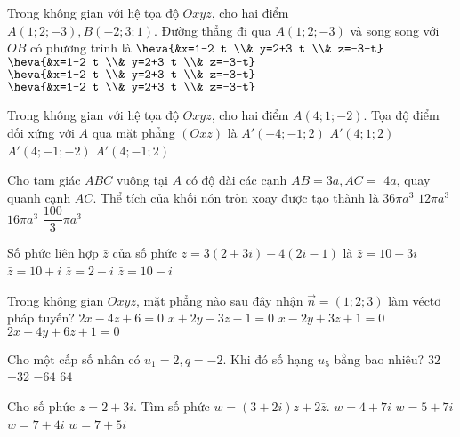 \begin{ex}%
Trong không gian với hệ tọa độ $O x y z$, cho hai điểm\\ $A(1; 2;-3), B(-2; 3; 1)$. Đường thẳng đi qua $A(1; 2;-3)$ và song song với $OB$ có phương trình là
\choice
{$\heva{&x=1-2 t \\& y=2+3 t \\& z=-3-t}$}
{$\heva{&x=1-2 t \\& y=2+3 t \\& z=-3-t}$}
{\True $\heva{&x=1-2 t \\& y=2+3 t \\& z=-3-t}$}
{$\heva{&x=1-2 t \\& y=2+3 t \\& z=-3-t}$}

\end{ex}
\begin{ex}%
Trong không gian với hệ tọa độ $O x y z$, cho hai điểm $A(4; 1;-2)$.
Tọa độ điểm đối xứng với $A$ qua mặt phẳng $(O x z)$ là
\choice
{$A'(-4;-1; 2)$}
{$A'(4; 1; 2)$}
{\True $A'(4;-1;-2)$}
{$A'(4;-1; 2)$}

\end{ex}
\begin{ex}%
Cho tam giác $ABC$ vuông tại $A$ có độ dài các cạnh $AB=3 a, AC=$ $4 a$, quay quanh cạnh $AC$. Thể tích của khối nón tròn xoay được tạo thành là
\choice
{$36\pi a^3$}
{$12\pi a^3$}
{\True $16\pi a^3$}
{$\dfrac{100}{3} \pi a^3$}

\end{ex}
\begin{ex}%
Số phức liên hợp $\bar{z}$ của số phức $z=3(2+3 i)-4(2 i-1)$ là
\choice
{$\bar{z}=10+3 i$}
{$\bar{z}=10+i$}
{$\bar{z}=2-i$}
{\True $\bar{z}=10-i$}

\end{ex}
\begin{ex}%
Trong không gian $O x y z$, mặt phẳng nào sau đây nhận $\vec{n}=(1; 2; 3)$ làm véctơ pháp tuyến?
\choice
{$2 x-4 z+6=0$}
{$x+2 y-3 z-1=0$}
{$x-2 y+3 z+1=0$}
{\True $2 x+4 y+6 z+1=0$}

\end{ex}
\begin{ex}%
Cho một cấp số nhân có $u_1=2, q=-2$. Khi đó số hạng $u_5$ bằng bao nhiêu?
\choice
{\True $32$}
{$-32$}
{$-64$}
{$64$}

\end{ex}
\begin{ex}%
Cho số phức $z=2+3 i$. Tìm số phức $w=(3+2 i) z+2\bar{z}$.
\choice
{\True $w=4+7 i$}
{$w=5+7 i$}
{$w=7+4 i$}
{$w=7+5 i$}

\end{ex}
